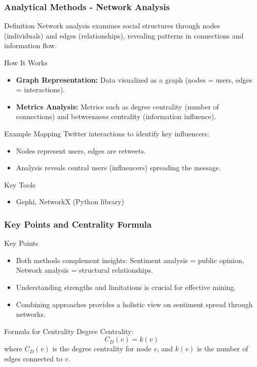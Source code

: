 \documentclass{beamer}
\begin{document}
\begin{frame}[fragile]
    \frametitle{Analytical Methods - Network Analysis}
    \begin{block}{Definition}
        Network analysis examines social structures through nodes (individuals) and edges (relationships), revealing patterns in connections and information flow.
    \end{block}
    \begin{block}{How It Works}
        \begin{itemize}
            \item \textbf{Graph Representation:} Data visualized as a graph (nodes = users, edges = interactions).
            \item \textbf{Metrics Analysis:} Metrics such as degree centrality (number of connections) and betweenness centrality (information influence).
        \end{itemize}
    \end{block}
    \begin{block}{Example}
        Mapping Twitter interactions to identify key influencers:
        \begin{itemize}
            \item Nodes represent users, edges are retweets.
            \item Analysis reveals central users (influencers) spreading the message.
        \end{itemize}
    \end{block}
    \begin{block}{Key Tools}
        \begin{itemize}
            \item Gephi, NetworkX (Python library)
        \end{itemize}
    \end{block}
\end{frame}

\begin{frame}[fragile]
    \frametitle{Key Points and Centrality Formula}
    \begin{block}{Key Points}
        \begin{itemize}
            \item Both methods complement insights: Sentiment analysis = public opinion, Network analysis = structural relationships.
            \item Understanding strengths and limitations is crucial for effective mining.
            \item Combining approaches provides a holistic view on sentiment spread through networks.
        \end{itemize}
    \end{block}
    \begin{block}{Formula for Centrality}
        Degree Centrality: 
        \begin{equation}
        C_D(v) = k(v)
        \end{equation}  
        where \( C_D(v) \) is the degree centrality for node \( v \), and \( k(v) \) is the number of edges connected to \( v \).
    \end{block}
\end{frame}
\end{document}
